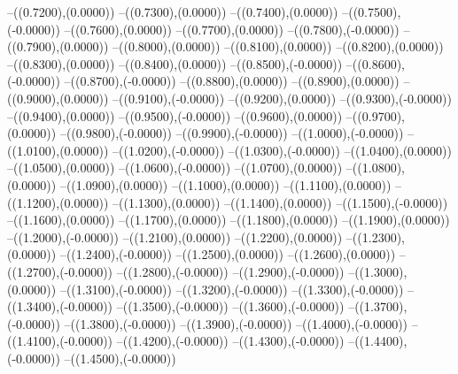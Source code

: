 {	--({\sx*(0.7200)},{\sy*(0.0000)})
	--({\sx*(0.7300)},{\sy*(0.0000)})
	--({\sx*(0.7400)},{\sy*(0.0000)})
	--({\sx*(0.7500)},{\sy*(-0.0000)})
	--({\sx*(0.7600)},{\sy*(0.0000)})
	--({\sx*(0.7700)},{\sy*(0.0000)})
	--({\sx*(0.7800)},{\sy*(-0.0000)})
	--({\sx*(0.7900)},{\sy*(0.0000)})
	--({\sx*(0.8000)},{\sy*(0.0000)})
	--({\sx*(0.8100)},{\sy*(0.0000)})
	--({\sx*(0.8200)},{\sy*(0.0000)})
	--({\sx*(0.8300)},{\sy*(0.0000)})
	--({\sx*(0.8400)},{\sy*(0.0000)})
	--({\sx*(0.8500)},{\sy*(-0.0000)})
	--({\sx*(0.8600)},{\sy*(-0.0000)})
	--({\sx*(0.8700)},{\sy*(-0.0000)})
	--({\sx*(0.8800)},{\sy*(0.0000)})
	--({\sx*(0.8900)},{\sy*(0.0000)})
	--({\sx*(0.9000)},{\sy*(0.0000)})
	--({\sx*(0.9100)},{\sy*(-0.0000)})
	--({\sx*(0.9200)},{\sy*(0.0000)})
	--({\sx*(0.9300)},{\sy*(-0.0000)})
	--({\sx*(0.9400)},{\sy*(0.0000)})
	--({\sx*(0.9500)},{\sy*(-0.0000)})
	--({\sx*(0.9600)},{\sy*(0.0000)})
	--({\sx*(0.9700)},{\sy*(0.0000)})
	--({\sx*(0.9800)},{\sy*(-0.0000)})
	--({\sx*(0.9900)},{\sy*(-0.0000)})
	--({\sx*(1.0000)},{\sy*(-0.0000)})
	--({\sx*(1.0100)},{\sy*(0.0000)})
	--({\sx*(1.0200)},{\sy*(-0.0000)})
	--({\sx*(1.0300)},{\sy*(-0.0000)})
	--({\sx*(1.0400)},{\sy*(0.0000)})
	--({\sx*(1.0500)},{\sy*(0.0000)})
	--({\sx*(1.0600)},{\sy*(-0.0000)})
	--({\sx*(1.0700)},{\sy*(0.0000)})
	--({\sx*(1.0800)},{\sy*(0.0000)})
	--({\sx*(1.0900)},{\sy*(0.0000)})
	--({\sx*(1.1000)},{\sy*(0.0000)})
	--({\sx*(1.1100)},{\sy*(0.0000)})
	--({\sx*(1.1200)},{\sy*(0.0000)})
	--({\sx*(1.1300)},{\sy*(0.0000)})
	--({\sx*(1.1400)},{\sy*(0.0000)})
	--({\sx*(1.1500)},{\sy*(-0.0000)})
	--({\sx*(1.1600)},{\sy*(0.0000)})
	--({\sx*(1.1700)},{\sy*(0.0000)})
	--({\sx*(1.1800)},{\sy*(0.0000)})
	--({\sx*(1.1900)},{\sy*(0.0000)})
	--({\sx*(1.2000)},{\sy*(-0.0000)})
	--({\sx*(1.2100)},{\sy*(0.0000)})
	--({\sx*(1.2200)},{\sy*(0.0000)})
	--({\sx*(1.2300)},{\sy*(0.0000)})
	--({\sx*(1.2400)},{\sy*(-0.0000)})
	--({\sx*(1.2500)},{\sy*(0.0000)})
	--({\sx*(1.2600)},{\sy*(0.0000)})
	--({\sx*(1.2700)},{\sy*(-0.0000)})
	--({\sx*(1.2800)},{\sy*(-0.0000)})
	--({\sx*(1.2900)},{\sy*(-0.0000)})
	--({\sx*(1.3000)},{\sy*(0.0000)})
	--({\sx*(1.3100)},{\sy*(-0.0000)})
	--({\sx*(1.3200)},{\sy*(-0.0000)})
	--({\sx*(1.3300)},{\sy*(-0.0000)})
	--({\sx*(1.3400)},{\sy*(-0.0000)})
	--({\sx*(1.3500)},{\sy*(-0.0000)})
	--({\sx*(1.3600)},{\sy*(-0.0000)})
	--({\sx*(1.3700)},{\sy*(-0.0000)})
	--({\sx*(1.3800)},{\sy*(-0.0000)})
	--({\sx*(1.3900)},{\sy*(-0.0000)})
	--({\sx*(1.4000)},{\sy*(-0.0000)})
	--({\sx*(1.4100)},{\sy*(-0.0000)})
	--({\sx*(1.4200)},{\sy*(-0.0000)})
	--({\sx*(1.4300)},{\sy*(-0.0000)})
	--({\sx*(1.4400)},{\sy*(-0.0000)})
	--({\sx*(1.4500)},{\sy*(-0.0000)})
}
